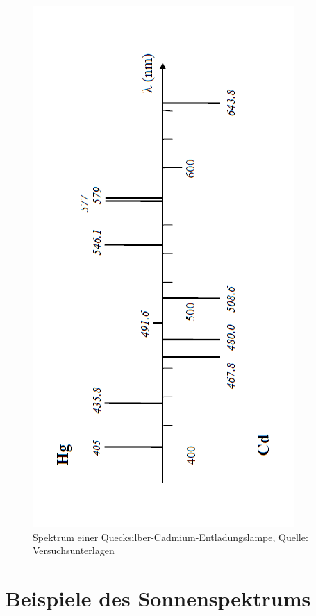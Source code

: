 		\begin{figure}[H]
			\center
			\includegraphics[scale=1, angle=-180]{referenzen/hg-cd-reference.PNG}
			\caption{Spektrum einer Quecksilber-Cadmium-Entladungslampe, Quelle: Versuchsunterlagen}
			\label{fig:hg-light-spec}
		\end{figure}


	\section{Beispiele des Sonnenspektrums} %
	\label{sec:beispiele_des_sonnenspektrums}
	
